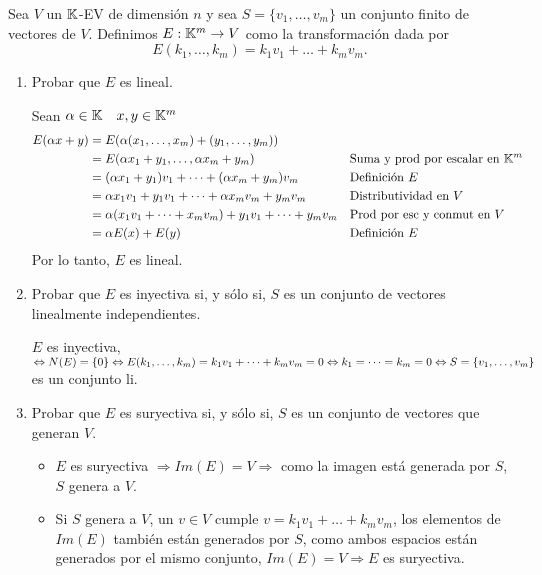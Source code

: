 \item Sea $V$ un $\mathbb{K}$-EV de dimensión $n$ y sea $S=\{v_1,\dots,v_m\}$ un conjunto finito de vectores de $V$. Definimos $E:\mathbb{K}^m\to V$ como la transformación dada por\[E(k_1,\dots,k_m)=k_1v_1+\dots+k_mv_m.\]\begin{enumerate}
    \item Probar que $E$ es lineal.
        \begin{mdframed}[style=s]
            Sean $\alpha\in\mathbb{K}\quad x,y\in\mathbb{K}^m$
            \begin{align*}
                E(\alpha x+y)&=E(\alpha(x_1,\dots,x_m)+(y_1,\dots,y_m))\\
                &=E(\alpha x_1+y_1,\dots,\alpha x_m+y_m)&&\text{Suma y prod por escalar en }\mathbb{K}^m\\
                &=(\alpha x_1+y_1)v_1+\dots+(\alpha x_m+y_m)v_m&&\text{Definición }E\\
                &=\alpha x_1v_1+y_1v_1+\dots+\alpha x_mv_m+y_mv_m&&\text{Distributividad en }V\\
                &=\alpha(x_1v_1+\dots+x_mv_m)+y_1v_1+\dots+y_mv_m&&\text{Prod por esc y conmut en }V\\
                &=\alpha E(x)+E(y)&&\text{Definición }E
            \end{align*}
            Por lo tanto, $E$ es lineal.
        \end{mdframed}
    \item Probar que $E$ es inyectiva si, y sólo si, $S$ es un conjunto de vectores linealmente independientes.
        \begin{mdframed}[style=s]
            $E$ es inyectiva, $\Leftrightarrow N(E)=\{0\}\Leftrightarrow E(k_1,\dots,k_m)=k_1v_1+\dots+k_mv_m=0 \Leftrightarrow k_1=\dots=k_m=0\\\Leftrightarrow S=\{v_1,\dots,v_m\}$ es un conjunto li.
        \end{mdframed}
    \item Probar que $E$ es suryectiva si, y sólo si, $S$ es un conjunto de vectores que generan $V$.
        \begin{mdframed}[style=s]
            \begin{itemize}
                \item $E$ es suryectiva $\Rightarrow Im(E)=V\Rightarrow$ como la imagen está generada por $S$, $S$ genera a $V$.
                \item Si $S$ genera a $V$, un $v\in V$ cumple $v=k_1v_1+\dots+k_mv_m$, los elementos de $Im(E)$ también están generados por $S$, como ambos espacios están generados por el mismo conjunto, $Im(E)=V\Rightarrow E$ es suryectiva.
            \end{itemize}
        \end{mdframed}
\end{enumerate}
